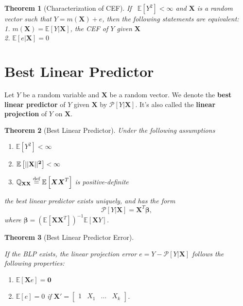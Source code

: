 \documentclass[
]{book}
\providecommand{\tightlist}{%
  \setlength{\itemsep}{0pt}\setlength{\parskip}{0pt}}
\newtheorem{theorem}{Theorem}[chapter]
\theoremstyle{definition}
\theoremstyle{definition}
\theoremstyle{definition}
\theoremstyle{definition}
\theoremstyle{remark}
\begin{document}
\begin{theorem}[Characterization of CEF]
\protect\hypertarget{thm:cef}{}\label{thm:cef}If ~\({\mathbb{E}\left[ Y^2 \right]}<\infty\) and \({\boldsymbol{X}}\) is a random vector such that \(Y=m({\boldsymbol{X}})+e\), then the following statements are equivalent:\\
1. \(m({\boldsymbol{X}})={\mathbb{E}\left[ Y|{\boldsymbol{X}} \right]}\), the CEF of \(Y\) given \({\boldsymbol{X}}\)\\
2. \({\mathbb{E}\left[ e|{\boldsymbol{X}} \right]}=0\)
\end{theorem}

\hypertarget{best-linear-predictor}{%
\section{Best Linear Predictor}\label{best-linear-predictor}}

Let \(Y\) be a random variable and \({\boldsymbol{X}}\) be a random vector. We denote the \textbf{best linear predictor} of \(Y\) given \({\boldsymbol{X}}\) by \(\mathscr{P}[Y|{\boldsymbol{X}}]\). It's also called the \textbf{linear projection} of \(Y\) on \({\boldsymbol{X}}\).

\begin{theorem}[Best Linear Predictor]
\protect\hypertarget{thm:blp}{}\label{thm:blp}Under the following assumptions

\begin{enumerate}
\def\labelenumi{\arabic{enumi}.}
\tightlist
\item
  \({\mathbb{E}\left[ Y^2 \right]}<\infty\)
\item
  \({\mathbb{E}\left[ ||\bf{X}||^2 \right]}<\infty\)
\item
  \({\mathbb{Q}}_{\bf{XX}}\stackrel{\text{def}}{=}{\mathbb{E}\left[ {\boldsymbol{X}}{\boldsymbol{X}}^T \right]}\) is positive-definite
\end{enumerate}

the best linear predictor exists uniquely, and has the form
\[
\mathscr{P}[Y|{\boldsymbol{X}}]={\boldsymbol{X}}^T{\boldsymbol{\beta}},
\]
where \({\boldsymbol{\beta}}=\left({\mathbb{E}\left[ {\boldsymbol{X}}{\boldsymbol{X}}^T \right]}\right)^{-1}{\mathbb{E}}[{\boldsymbol{X}}Y]\).
\end{theorem}

\begin{theorem}[Best Linear Predictor Error]
\protect\hypertarget{thm:blperror}{}\label{thm:blperror}

If the BLP exists, the linear projection error \(e=Y-\mathscr{P}[Y|{\boldsymbol{X}}]\) follows the following properties:

\begin{enumerate}
\def\labelenumi{\arabic{enumi}.}
\tightlist
\item
  \({\mathbb{E}}[{\boldsymbol{X}}e]={\boldsymbol{0}}\)
\item
  \({\mathbb{E}}[e]=0\) if
  \({\boldsymbol{X}}'=\begin{bmatrix}1 & X_1 & \ldots & X_k \end{bmatrix}\).
\end{enumerate}

\end{theorem}
\end{document}
